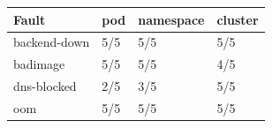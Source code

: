 \begin{tabular}{llll}
\toprule
Fault & pod & namespace & cluster \\
\midrule
backend-down & 5/5 & 5/5 & 5/5 \\
badimage & 5/5 & 5/5 & 4/5 \\
dns-blocked & 2/5 & 3/5 & 5/5 \\
oom & 5/5 & 5/5 & 5/5 \\
\bottomrule
\end{tabular}
